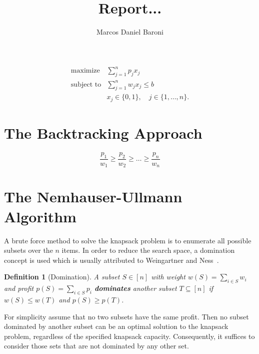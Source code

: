 \documentclass{article}
\title{Report...}
\author{Marcos Daniel Baroni}
\newtheorem{mydef}{Definition}
\let\emph\textbf
\begin{document}
\maketitle



\begin{align*}
  \text{maximize} & \sum_{j=1}^n p_j x_j \\
  \text{subject to} & \sum_{j=1}^n w_j x_j \leq b \\
   & x_j \in \{0, 1\}, \quad j \in \{1, \ldots, n\}.
\end{align*}

\section{}

\section{The Backtracking Approach}
\cite{lueker1998average}
\cite{horowitz1978fundamentals}

\begin{displaymath}
  \frac{p_1}{w_1} \geqslant
  \frac{p_2}{w_2} \geqslant
  \ldots \geqslant
  \frac{p_n}{w_n}
\end{displaymath}

\newpage

\section{The Nemhauser-Ullmann Algorithm}

A brute force method to solve the knapsack problem is to enumerate all possible subsets over the $n$ items.
In order to reduce the search space, a domination concept is used which is usually attributed to Weingartner and Ness~\cite{weingartner1967methods}.
\begin{mydef}[Domination]
A subset $S \in [n]$ with weight $w(S) = \sum_{i \in S} w_i$  and profit $p(S) = \sum_{i \in S} p_i$
\emph{dominates} another subset $T \subseteq [n]$ if $w(S) \leqslant w(T)$ and $p(S) \geqslant p(T)$.
\end{mydef}

For simplicity assume that no two subsets have the same profit.
Then no subset dominated by another subset can be an optimal solution to the knapsack problem, regardless of the specified knapsack capacity.
Consequently, it suffices to consider those sets that are not dominated by any other set.
\end{document}
